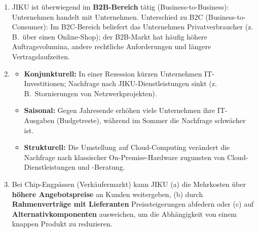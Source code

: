 \documentclass[11pt, a4paper]{article}
\begin{document}
\begin{enumerate}[label=(\alph*)]
  \item JIKU ist überwiegend im \textbf{B2B-Bereich} tätig (Business-to-Business): Unternehmen
  handelt mit Unternehmen. Unterschied zu B2C (Business-to-Consumer): Im B2C-Bereich beliefert
  das Unternehmen Privatverbraucher (z.\,B.\ über einen Online-Shop); der B2B-Markt hat häufig
  höhere Auftragsvolumina, andere rechtliche Anforderungen und längere Vertragslaufzeiten.

  \item
  \begin{itemize}
    \item \textbf{Konjunkturell:} In einer Rezession kürzen Unternehmen IT-Investitionen;
    Nachfrage nach JIKU-Dienstleistungen sinkt (z.\,B.\ Stornierungen von Netzwerkprojekten).
    \item \textbf{Saisonal:} Gegen Jahresende erhöhen viele Unternehmen ihre IT-Ausgaben
    (Budgetreste), während im Sommer die Nachfrage schwächer ist.
    \item \textbf{Strukturell:} Die Umstellung auf Cloud-Computing verändert die Nachfrage
    nach klassischer On-Premise-Hardware zugunsten von Cloud-Dienstleistungen und -Beratung.
  \end{itemize}

  \item Bei Chip-Engpässen (Verkäufermarkt) kann JIKU (a) die Mehrkosten über \textbf{höhere
  Angebotspreise} an Kunden weitergeben, (b) durch \textbf{Rahmenverträge mit Lieferanten}
  Preissteigerungen abfedern oder (c) auf \textbf{Alternativkomponenten} ausweichen, um
  die Abhängigkeit von einem knappen Produkt zu reduzieren.
\end{enumerate}
\end{document}
